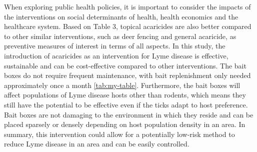 \documentclass[12pt, centerh1]{article}
\begin{document}
When exploring public health policies, it is important to consider the impacts of the interventions on social determinants of health, health economics and the healthcare system. Based on Table 3, topical acaricides are also better compared to other similar interventions, such as deer fencing and general acaricide, as preventive measures of interest in terms of all aspects.  In this study, the introduction of acaricides as an intervention for Lyme disease is effective, sustainable and can be cost-effective compared to other interventions. The bait boxes do not require frequent maintenance, with bait replenishment only needed approximately once a month \ref{tab:my-table}. Furthermore, the bait boxes will affect populations of Lyme disease hosts other than rodents, which means they still have the potential to be effective even if the ticks adapt to host preference. Bait boxes are not damaging to the environment in which they reside and can be placed sparsely or densely depending on host population density in an area. In summary, this intervention could allow for a potentially low-risk method to reduce Lyme disease in an area and can be easily controlled.
 
\end{document}
